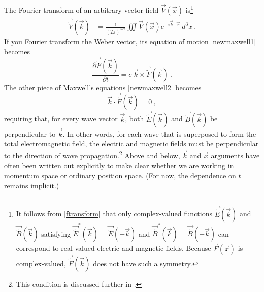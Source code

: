 \documentclass[12pt,secnumarabic,amsmath,amssymb,balancelastpage,nofootinbib]{article}
\begin{document}
The Fourier transform of an arbitrary vector field $\vec{V}(\vec{x})$ is\footnote{It follows from \eqref{ftransform} that only complex-valued functions $\vec{\widetilde{E}}(\vec{k})$ and $\vec{\widetilde{B}}(\vec{k})$ satisfying $\vec{\widetilde{E}}^*\!\!(\vec{k})=\vec{\widetilde{E}}(-\vec{k})$ and $\vec{\widetilde{B}}^*\!\!(\vec{k})=\vec{\widetilde{B}}(-\vec{k})$ can correspond to real-valued electric and magnetic fields.  Because $\vec{F}(\vec{x})$ is complex-valued, $\vec{\widetilde{F}}(\vec{k})$ does not have such a symmetry.\label{symmetrytrick}}
\begin{align}
\vec{\widetilde{V}}(\vec{k})&=\frac{1}{(2\pi)^{3/2}}\iiint{ \vec{V}(\vec{x}) e^{- i \vec{k} \cdot \vec{x}} \: d^3 x}
\ .
\label{ftransform}
\end{align}
If you Fourier transform the Weber vector, its equation of motion \eqref{newmaxwell1} becomes
\begin{equation}
\frac{\partial \vec{\widetilde{F}}(\vec{k})}{\partial t} =c\:\vec{k}\times\vec{\widetilde{F}}(\vec{k})
\ .
\label{kform}
\end{equation}
The other piece of Maxwell's equations \eqref{newmaxwell2} becomes
\begin{equation}
\vec{k}\cdot\vec{\widetilde{F}}(\vec{k})=0
\ ,
\label{newmaxwell2kspace}
\end{equation}
requiring that, for every wave vector $\vec{k}$, both $\vec{\widetilde{E}}(\vec{k})$ and $\vec{\widetilde{B}}(\vec{k})$ be perpendicular to $\vec{k}$.  In other words, for each wave that is superposed to form the total electromagnetic field, the electric and magnetic fields must be perpendicular to the direction of wave propagation.\footnote{This condition is discussed further in \citet[pg.\ 583--584]{goodnelson1971}.}  Above and below, $\vec{k}$ and $\vec{x}$ arguments have often been written out explicitly to make clear whether we are working in momentum space or ordinary position space. (For now, the dependence on $t$ remains implicit.)
\end{document}
